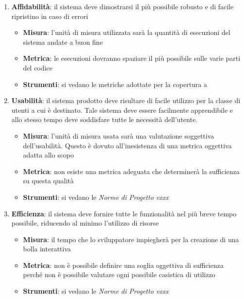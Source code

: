 {\begin{enumerate}
  \item \textbf{Affidabilità}: il sistema deve dimostrarsi il più possibile robusto e di facile ripristino in caso di errori
  
  \begin{itemize}
    \item \textbf{Misura}: l’unità di misura utilizzata sarà la quantità di esecuzioni del sistema andate a buon fine
    \item \textbf{Metrica}: le esecuzioni dovranno spaziare il più
    possibile sulle varie parti del codice
    \item \textbf{Strumenti}: si vedano le metriche adottate per la
    copertura a %
  \end{itemize}
  
  \item \textbf{Usabilità}: il sistema prodotto deve risultare di facile
  utilizzo per la classe di utenti a cui è destinato. Tale sistema
  deve essere facilmente apprendibile e allo stesso tempo deve
  soddisfare tutte le necessità dell’utente. 
  \begin{itemize}
    \item \textbf{Misura}: l’unità di misura usata sarà una valutazione soggettiva dell’usabilità. Questo è dovuto all’inesistenza di una metrica oggettiva adatta allo scopo
    \item \textbf{Metrica}:  non esiste una metrica adeguata che determinerà la sufficienza su questa qualità
    \item \textbf{Strumenti}: si vedano le  \emph{Norme di Progetto vxxx} 
  \end{itemize}
  
  \item \textbf{Efficienza}: il sistema deve fornire tutte le funzionalità nel più breve tempo possibile,
  riducendo al minimo l’utilizzo di risorse
  \begin{itemize}
    \item \textbf{Misura}: il tempo che lo sviluppatore impiegherà per la creazione di una bolla interattiva
    \item \textbf{Metrica}: non è possibile definire una soglia oggettiva di sufficienza perché non è possibile valutare ogni possibile casistica di utilizzo
    \item \textbf{Strumenti}: si vedano le  \emph{Norme di Progetto vxxx} 
  \end{itemize}
  

\end{enumerate}}
